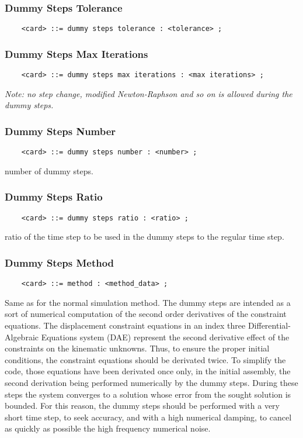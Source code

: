\subsubsection{Dummy Steps Tolerance}
\begin{verbatim}
    <card> ::= dummy steps tolerance : <tolerance> ;
\end{verbatim}

\subsubsection{Dummy Steps Max Iterations}
\begin{verbatim}
    <card> ::= dummy steps max iterations : <max iterations> ;
\end{verbatim}    
{\em
    Note: no step change, modified Newton-Raphson and so on is allowed
    during the dummy steps.
}

\subsubsection{Dummy Steps Number}
\begin{verbatim}
    <card> ::= dummy steps number : <number> ;
\end{verbatim}
number of dummy steps.

\subsubsection{Dummy Steps Ratio}
\begin{verbatim}
    <card> ::= dummy steps ratio : <ratio> ;
\end{verbatim}
ratio of the time step to be used in the dummy steps to the regular
time step.

\subsubsection{Dummy Steps Method}
\begin{verbatim}
    <card> ::= method : <method_data> ;
\end{verbatim}
Same as for the normal simulation method. 
The dummy steps are intended as a sort of numerical computation 
of the second order derivatives of the constraint equations. 
The displacement constraint equations in an index three 
Differential-Algebraic Equations system
(DAE) represent the second derivative effect of the constraints on the
kinematic unknowns. Thus, to ensure the proper initial conditions, the
constraint equations should be derivated twice. To simplify the code,
those equations have been derivated once only, in the initial assembly,
the second derivation being performed numerically by the dummy steps.
During these steps the system converges to a solution whose error from
the sought solution is bounded. For this reason, the dummy steps
should be performed with a very short time step, to seek accuracy, and
with a high numerical damping, to cancel as quickly as possible the high
frequency numerical noise.

